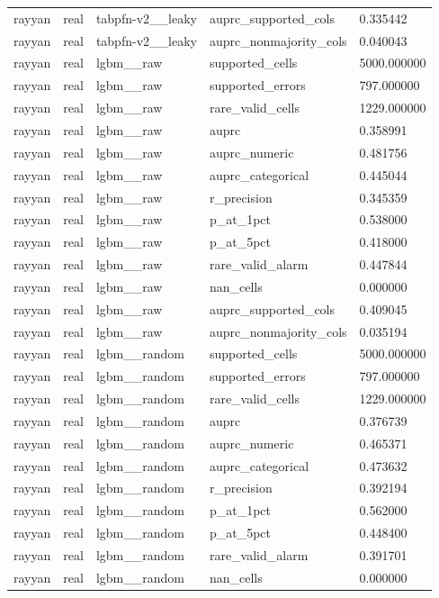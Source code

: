 \begin{tabular}{lllll}
rayyan & real & tabpfn-v2\_\_leaky & auprc\_supported\_cols & 0.335442 \\
rayyan & real & tabpfn-v2\_\_leaky & auprc\_nonmajority\_cols & 0.040043 \\
rayyan & real & lgbm\_\_raw & supported\_cells & 5000.000000 \\
rayyan & real & lgbm\_\_raw & supported\_errors & 797.000000 \\
rayyan & real & lgbm\_\_raw & rare\_valid\_cells & 1229.000000 \\
rayyan & real & lgbm\_\_raw & auprc & 0.358991 \\
rayyan & real & lgbm\_\_raw & auprc\_numeric & 0.481756 \\
rayyan & real & lgbm\_\_raw & auprc\_categorical & 0.445044 \\
rayyan & real & lgbm\_\_raw & r\_precision & 0.345359 \\
rayyan & real & lgbm\_\_raw & p\_at\_1pct & 0.538000 \\
rayyan & real & lgbm\_\_raw & p\_at\_5pct & 0.418000 \\
rayyan & real & lgbm\_\_raw & rare\_valid\_alarm & 0.447844 \\
rayyan & real & lgbm\_\_raw & nan\_cells & 0.000000 \\
rayyan & real & lgbm\_\_raw & auprc\_supported\_cols & 0.409045 \\
rayyan & real & lgbm\_\_raw & auprc\_nonmajority\_cols & 0.035194 \\
rayyan & real & lgbm\_\_random & supported\_cells & 5000.000000 \\
rayyan & real & lgbm\_\_random & supported\_errors & 797.000000 \\
rayyan & real & lgbm\_\_random & rare\_valid\_cells & 1229.000000 \\
rayyan & real & lgbm\_\_random & auprc & 0.376739 \\
rayyan & real & lgbm\_\_random & auprc\_numeric & 0.465371 \\
rayyan & real & lgbm\_\_random & auprc\_categorical & 0.473632 \\
rayyan & real & lgbm\_\_random & r\_precision & 0.392194 \\
rayyan & real & lgbm\_\_random & p\_at\_1pct & 0.562000 \\
rayyan & real & lgbm\_\_random & p\_at\_5pct & 0.448400 \\
rayyan & real & lgbm\_\_random & rare\_valid\_alarm & 0.391701 \\
rayyan & real & lgbm\_\_random & nan\_cells & 0.000000 \\

\end{tabular}
